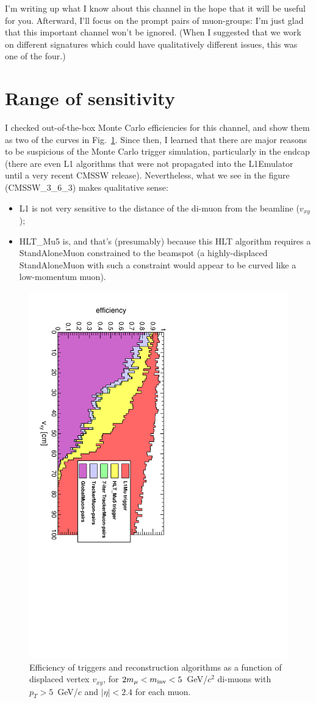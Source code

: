 \documentclass[12pt]{article}
\newcommand{\s}[1]{{\mbox{\scriptsize #1}}}
\begin{document}
I'm writing up what I know about this channel in the hope that it will
be useful for you.  Afterward, I'll focus on the prompt pairs of
muon-groups: I'm just glad that this important channel won't be
ignored.  (When I suggested that we work on different signatures which
could have qualitatively different issues, this was one of the four.)

\section{Range of sensitivity}

I checked out-of-the-box Monte Carlo efficiencies for this channel,
and show them as two of the curves in Fig.~\ref{fig:acceptance1}.
Since then, I learned that there are major reasons to be suspicious of
the Monte Carlo trigger simulation, particularly in the endcap (there
are even L1 algorithms that were not propagated into the L1Emulator
until a very recent CMSSW release).  Nevertheless, what we see in the
figure (CMSSW\_3\_6\_3) makes qualitative sense:
\begin{itemize}
\item L1 is not very sensitive to the distance of the di-muon from the
  beamline ($v_{xy}$);
\item HLT\_Mu5 is, and that's (presumably) because this HLT algorithm
  requires a StandAloneMuon constrained to the beamspot (a
  highly-displaced StandAloneMuon with such a constraint would appear
  to be curved like a low-momentum muon).
\end{itemize}

\begin{figure}
\begin{center}
\includegraphics[height=0.8\linewidth, angle=90]{fig/acceptance5_plot/dispvert.pdf}
\end{center}

\caption{Efficiency of triggers and reconstruction algorithms as a
  function of displaced vertex $v_{xy}$, for $2m_\mu < m_\s{inv} <
  5$~GeV/$c^2$ di-muons with $p_T > 5$~GeV/$c$ and $|\eta| < 2.4$ for
  each muon. \label{fig:acceptance1}}
\end{figure}
\end{document}
